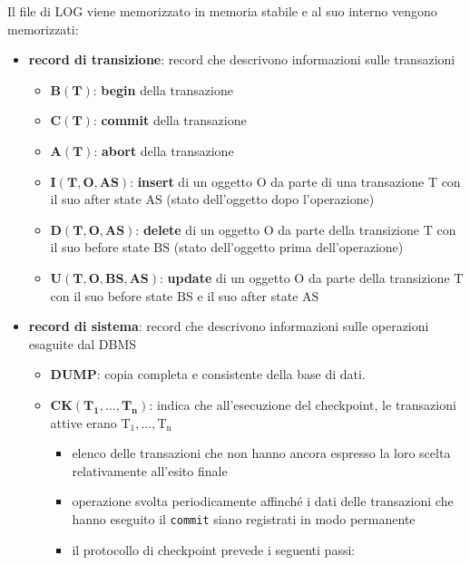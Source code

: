 Il file di LOG viene memorizzato in memoria stabile e al suo interno vengono memorizzati:
\begin{itemize}[label=$\triangleright$, itemsep=\medskipamount]
  \item \textbf{record di transizione}: record che descrivono informazioni sulle transazioni
  \begin{itemize}[label=$\diamond$, itemsep=\smallskipamount]
    \item $\mathbf{B(T)}$: \textcolor{azzurrino}{\textbf{begin}} della transazione
    \item $\mathbf{C(T)}$: \textcolor{azzurrino}{\textbf{commit}} della transazione
    \item $\mathbf{A(T)}$: \textcolor{azzurrino}{\textbf{abort}} della transazione
    \item $\mathbf{I(T,O,AS)}$: \textcolor{azzurrino}{\textbf{insert}} di un oggetto $\mathrm{O}$ da parte di una transazione $\mathrm{T}$ con il suo after state $\mathrm{AS}$ (stato dell'oggetto dopo l'operazione)
    \item $\mathbf{D(T,O,AS)}$: \textcolor{azzurrino}{\textbf{delete}} di un oggetto $\mathrm{O}$ da parte della transizione $\mathrm{T}$ con il suo before state $\mathrm{BS}$ (stato dell'oggetto prima dell'operazione)
    \item $\mathbf{U(T,O,BS,AS)}$: \textcolor{azzurrino}{\textbf{update}} di un oggetto $\mathrm{O}$ da parte della transizione $\mathrm{T}$ con il suo before state $\mathrm{BS}$ e il suo after state $\mathrm{AS}$
  \end{itemize}
  \item \textbf{record di sistema}: record che descrivono informazioni sulle operazioni esaguite dal DBMS
  \begin{itemize}[label=$\circ$, itemsep=\smallskipamount]
    \item $\mathbf{DUMP}$: copia completa e consistente della base di dati.
    \item $\mathbf{CK(T_1, \dots, T_n)}$: indica che all'esecuzione del checkpoint, le transazioni attive erano $\mathrm{T_1, \dots, T_n}$
    \begin{itemize}[itemsep=\smallskipamount]
      \item elenco delle transazioni che non hanno ancora espresso la loro scelta relativamente all'esito finale
      \item operazione svolta periodicamente affinché i dati delle transazioni che hanno eseguito il \texttt{commit} siano registrati in modo permanente
      \item il protocollo di checkpoint prevede i seguenti passi:

\end{itemize}
\end{itemize}
\end{itemize}
